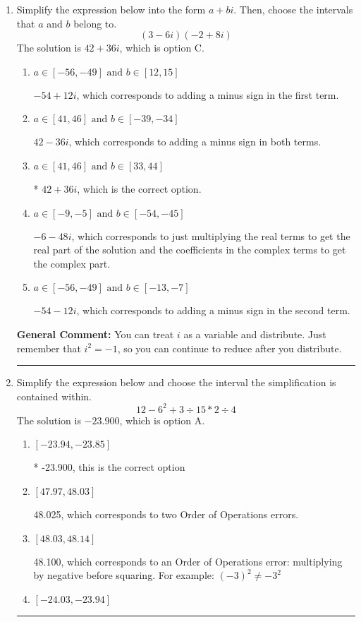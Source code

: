 \documentclass{extbook}[14pt]
\newcommand{\litem}[1]{\item #1

\rule{\textwidth}{0.4pt}}
\begin{document}
\begin{enumerate}\litem{
Simplify the expression below into the form $a+bi$. Then, choose the intervals that $a$ and $b$ belong to.
\[ (3 - 6 i)(-2 + 8 i) \]The solution is \( 42 + 36 i \), which is option C.\begin{enumerate}[label=\Alph*.]
\item \( a \in [-56, -49] \text{ and } b \in [12, 15] \)

 $-54 + 12 i$, which corresponds to adding a minus sign in the first term.
\item \( a \in [41, 46] \text{ and } b \in [-39, -34] \)

 $42 - 36 i$, which corresponds to adding a minus sign in both terms.
\item \( a \in [41, 46] \text{ and } b \in [33, 44] \)

* $42 + 36 i$, which is the correct option.
\item \( a \in [-9, -5] \text{ and } b \in [-54, -45] \)

 $-6 - 48 i$, which corresponds to just multiplying the real terms to get the real part of the solution and the coefficients in the complex terms to get the complex part.
\item \( a \in [-56, -49] \text{ and } b \in [-13, -7] \)

 $-54 - 12 i$, which corresponds to adding a minus sign in the second term.
\end{enumerate}

\textbf{General Comment:} You can treat $i$ as a variable and distribute. Just remember that $i^2=-1$, so you can continue to reduce after you distribute.
}
\litem{
Simplify the expression below and choose the interval the simplification is contained within.
\[ 12 - 6^2 + 3 \div 15 * 2 \div 4 \]The solution is \( -23.900 \), which is option A.\begin{enumerate}[label=\Alph*.]
\item \( [-23.94, -23.85] \)

* -23.900, this is the correct option
\item \( [47.97, 48.03] \)

 48.025, which corresponds to two Order of Operations errors.
\item \( [48.03, 48.14] \)

 48.100, which corresponds to an Order of Operations error: multiplying by negative before squaring. For example: $(-3)^2 \neq -3^2$
\item \( [-24.03, -23.94] \)


\end{enumerate}}
\end{enumerate}
\end{document}
